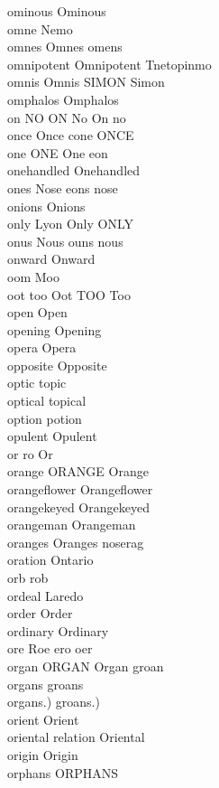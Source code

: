 ominous Ominous\\
omne Nemo\\
omnes Omnes omens\\
omnipotent Omnipotent Tnetopinmo\\
omnis Omnis SIMON Simon\\
omphalos Omphalos\\
on NO ON No On no\\
once Once cone ONCE\\
one ONE One eon\\
onehandled Onehandled\\
ones Nose eons nose\\
onions Onions\\
only Lyon Only ONLY\\
onus Nous ouns nous\\
onward Onward\\
oom Moo\\
oot too Oot TOO Too\\
open Open\\
opening Opening\\
opera Opera\\
opposite Opposite\\
optic topic\\
optical topical\\
option potion\\
opulent Opulent\\
or ro Or\\
orange ORANGE Orange\\
orangeflower Orangeflower\\
orangekeyed Orangekeyed\\
orangeman Orangeman\\
oranges Oranges noserag\\
oration Ontario\\
orb rob\\
ordeal Laredo\\
order Order\\
ordinary Ordinary\\
ore Roe ero oer\\
organ ORGAN Organ groan\\
organs groans\\
organs.) groans.)\\
orient Orient\\
oriental relation Oriental\\
origin Origin\\
orphans ORPHANS\\
